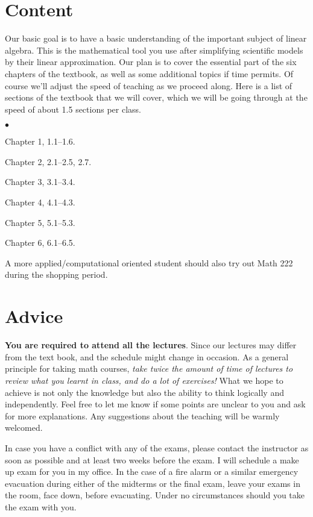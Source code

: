 \documentclass[margin,line]{res}
\newenvironment{list2}{
  \begin{list}{$\bullet$}{%
      \setlength{\itemsep}{0in}
      \setlength{\parsep}{0in} \setlength{\parskip}{0in}
      \setlength{\topsep}{0in} \setlength{\partopsep}{0in}
      \setlength{\leftmargin}{0.2in}}}{\end{list}}
\begin{document}
\begin{resume}
\section{\sc Content}
Our basic goal is to have a basic understanding of the important subject of linear algebra. This is the mathematical tool you use after simplifying scientific models by their linear approximation. Our plan is to cover the essential part of the six chapters of the textbook, as well as some additional topics if time permits. Of course we'll adjust the speed of teaching as we proceed along. Here is a list of sections of the textbook that we will cover, which we will be going through at the speed of about 1.5 sections per class.
\begin{list2}
\item Chapter 1, 1.1--1.6.
\item Chapter 2, 2.1--2.5, 2.7.
\item Chapter 3, 3.1--3.4.
\item Chapter 4, 4.1--4.3.
\item Chapter 5, 5.1--5.3.
\item Chapter 6, 6.1--6.5.
\end{list2}

A more applied/computational oriented student should also try out Math 222 during the shopping period.

\section{\sc Advice}
{\bf You are required to attend all the lectures}. Since our
lectures may differ from the text book, and the
schedule might change in occasion. As a general principle for
taking math courses, \emph{take twice the amount of time of lectures
to review what you learnt in class, and do a lot of exercises!} What
we hope to achieve is not only the knowledge but also the ability
to think logically and independently. Feel free to let me know if
some points are unclear to you and ask for more explanations. Any
suggestions about the teaching will be warmly welcomed.

In case you have a conflict with any of the exams, please contact the
instructor as soon as possible and at least two weeks before the
exam. I will schedule a make up exam for you in my office. In the case of a fire alarm or a similar emergency evacuation during either of the midterms or the final exam, leave your exams in the room, face down, before evacuating. Under no circumstances should you take the exam with you.



\end{resume}
\end{document}
